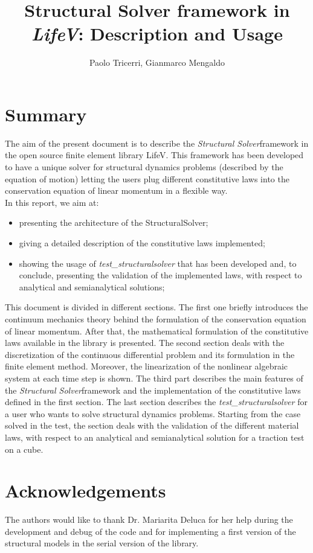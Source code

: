 \documentclass[a4paper, 10pt,twoside]{report}
\title{Structural Solver framework in \textit{LifeV}:
Description and Usage}
\author{Paolo Tricerri, Gianmarco Mengaldo}
\theoremstyle{plain}
\theoremstyle{definition}
\theoremstyle{remark}
\newcommand{\SSol}{\textit{Structural Solver}}
\begin{document}
\maketitle


\section*{Summary} The aim of the present document is to describe the
\SSol framework in the open source finite element library LifeV. This
framework has been developed to have a unique solver for structural
dynamics problems (described by the equation of motion) letting the
users plug different constitutive laws into the conservation
equation of linear momentum in a flexible way.\\ In this report, we
aim at:
\begin{itemize}
\item presenting the architecture of the StructuralSolver;
\item giving a detailed description of the constitutive laws
  implemented;
\item showing the usage of \textit{test\_structuralsolver} that has
  been developed and, to conclude, presenting the validation of the
  implemented laws, with respect to analytical and semianalytical
  solutions;
\end{itemize} This document is divided in different sections. The
first one briefly introduces the continuum mechanics theory behind the
formulation of the conservation equation of linear momentum. After
that, the mathematical formulation of the constitutive laws available
in the library is presented. The second section deals with the
discretization of the continuous differential problem and its
formulation in the finite element method. Moreover, the linearization
of the nonlinear algebraic system at each time step is shown. The
third part describes the main features of the \SSol framework and the
implementation of the constitutive laws defined in the first
section. The last section describes the
\textit{test\_structuralsolver} for a user who wants to solve
structural dynamics problems. Starting from the case solved in the
test, the section deals with the validation of the different material
laws, with respect to an analytical and semianalytical solution for a
traction test on a cube.\\

\section*{Acknowledgements} The authors would like to thank
Dr. Mariarita Deluca for her help during the development and debug of
the code and for implementing a first version of the structural models
in the serial version of the library.

\tableofcontents
\newpage









\end{document}
